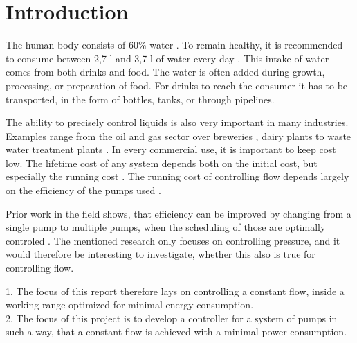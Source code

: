 \chapter{Introduction}\label{ch:introduction}
The human body consists of 60\% water \cite{HumanWater}.
To remain healthy, 
it is recommended to consume between 2,7 l and 3,7 l of water every day \cite{DailyWater}.
This intake of water comes from both drinks and food.
The water is often added during growth, processing, or preparation of food.
For drinks to reach the consumer it has to be transported, 
in the form of bottles, tanks, or through pipelines.

The ability to precisely control liquids is also very important in many industries.
Examples range from the oil and gas sector \cite{OilFlow} over breweries \cite{BrewFlow},
dairy plants \cite{DairyFlow} to waste water treatment plants \cite{WastewaterFlow}.
In every commercial use,
it is important to keep cost low.
The lifetime cost of any system depends both on the initial cost,
but especially the running cost \cite{LifetimeCost}.
The running cost of controlling flow depends largely on the efficiency of the pumps used \cite{LifeCycleCostEfficiency}.

Prior work in the field shows, 
that efficiency can be improved by changing from a single pump to multiple pumps,
when the scheduling of those are optimally controled \cite{YangMultiPump2008}. 
The mentioned research only focuses on controlling pressure,
and it would therefore be interesting to investigate, 
whether this also is true for controlling flow.


1. The focus of this report therefore lays on controlling a constant flow,
inside a working range optimized for minimal energy consumption.
\\

2. The focus of this project is to develop a controller for a system of pumps in such a way,
that a constant flow is achieved with a minimal power consumption.
\\

